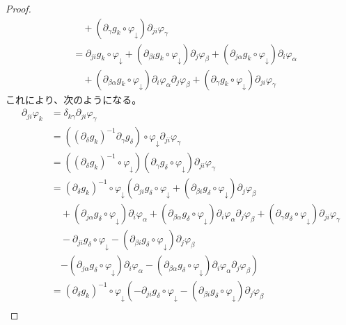 \documentclass[dvipdfmx]{jsarticle}
\begin{document}
\begin{proof}
\begin{align*}
&\quad + \left( \partial_{\gamma}g_{k} \circ \varphi_{\downarrow} \right)\partial_{ji}\varphi_{\gamma}\\
&= \partial_{ji}g_{k} \circ \varphi_{\downarrow} + \left( \partial_{\beta i}g_{k} \circ \varphi_{\downarrow} \right)\partial_{j}\varphi_{\beta} + \left( \partial_{j\alpha}g_{k} \circ \varphi_{\downarrow} \right)\partial_{i}\varphi_{\alpha} \\
&\quad + \left( \partial_{\beta\alpha}g_{k} \circ \varphi_{\downarrow} \right)\partial_{i}\varphi_{\alpha}\partial_{j}\varphi_{\beta} + \left( \partial_{\gamma}g_{k} \circ \varphi_{\downarrow} \right)\partial_{ji}\varphi_{\gamma}
\end{align*}
これにより、次のようになる。
\begin{align*}
\partial_{ji}\varphi_{k} &= \delta_{k\gamma}\partial_{ji}\varphi_{\gamma}\\
&= \left( \left( \partial_{\delta}g_{k} \right)^{- 1}\partial_{\gamma}g_{\delta} \right) \circ \varphi_{\downarrow}\partial_{ji}\varphi_{\gamma}\\
&= \left( \left( \partial_{\delta}g_{k} \right)^{- 1} \circ \varphi_{\downarrow} \right)\left( \partial_{\gamma}g_{\delta} \circ \varphi_{\downarrow} \right)\partial_{ji}\varphi_{\gamma}\\
&= \left( \partial_{\delta}g_{k} \right)^{- 1} \circ \varphi_{\downarrow}\left( \partial_{ji}g_{\delta} \circ \varphi_{\downarrow} + \left( \partial_{\beta i}g_{\delta} \circ \varphi_{\downarrow} \right)\partial_{j}\varphi_{\beta} \right. \\
&\quad + \left( \partial_{j\alpha}g_{\delta} \circ \varphi_{\downarrow} \right)\partial_{i}\varphi_{\alpha} + \left( \partial_{\beta\alpha}g_{\delta} \circ \varphi_{\downarrow} \right)\partial_{i}\varphi_{\alpha}\partial_{j}\varphi_{\beta} + \left( \partial_{\gamma}g_{\delta} \circ \varphi_{\downarrow} \right)\partial_{ji}\varphi_{\gamma} \\
&\quad - \partial_{ji}g_{\delta} \circ \varphi_{\downarrow} - \left( \partial_{\beta i}g_{\delta} \circ \varphi_{\downarrow} \right)\partial_{j}\varphi_{\beta} \\
&\quad \left. - \left( \partial_{j\alpha}g_{\delta} \circ \varphi_{\downarrow} \right)\partial_{i}\varphi_{\alpha} - \left( \partial_{\beta\alpha}g_{\delta} \circ \varphi_{\downarrow} \right)\partial_{i}\varphi_{\alpha}\partial_{j}\varphi_{\beta} \right)\\
&= \left( \partial_{\delta}g_{k} \right)^{- 1} \circ \varphi_{\downarrow}\left( - \partial_{ji}g_{\delta} \circ \varphi_{\downarrow} - \left( \partial_{\beta i}g_{\delta} \circ \varphi_{\downarrow} \right)\partial_{j}\varphi_{\beta} \right. \\

\end{align*}
\end{proof}
\end{document}
